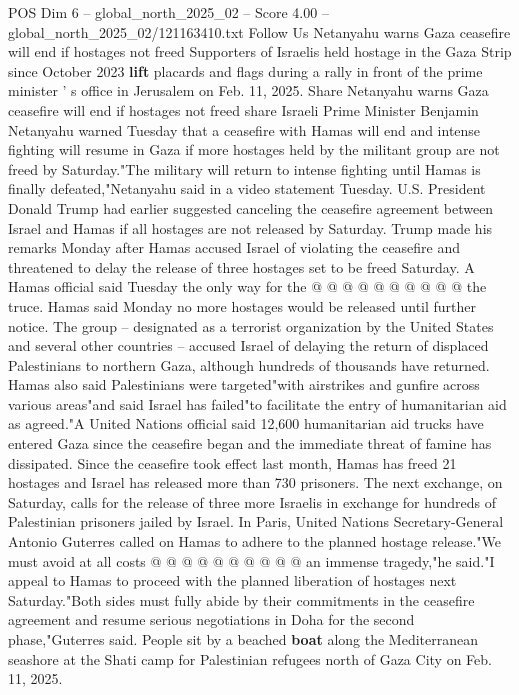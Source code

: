\begin{textsample}{POS Dim 6 – global\_north\_2025\_02 – Score 4.00 – global\_north\_2025\_02/121163410.txt}  \label{ex:f6_pos_346}
Follow Us Netanyahu warns Gaza ceasefire will end if hostages not freed Supporters of Israelis held hostage in the Gaza Strip since October 2023 \textbf{lift} placards and flags during a rally in front of the prime minister ' s office in Jerusalem on Feb. 11, 2025.
Share Netanyahu warns Gaza ceasefire will end if hostages not freed share Israeli Prime Minister Benjamin Netanyahu warned Tuesday that a ceasefire with Hamas will end and intense fighting will resume in Gaza if more hostages held by the militant group are not freed by Saturday."The military will return to intense fighting until Hamas is finally defeated,"Netanyahu said in a video statement Tuesday.
U.S.
President Donald Trump had earlier suggested canceling the ceasefire agreement between Israel and Hamas if all hostages are not released by Saturday.
Trump made his remarks Monday after Hamas accused Israel of violating the ceasefire and threatened to delay the release of three hostages set to be freed Saturday.
A Hamas official said Tuesday the only way for the @ @ @ @ @ @ @ @ @ @ the truce.
Hamas said Monday no more hostages would be released until further notice.
The group -- designated as a terrorist organization by the United States and several other countries -- accused Israel of delaying the return of displaced Palestinians to northern Gaza, although hundreds of thousands have returned.
Hamas also said Palestinians were targeted"with airstrikes and gunfire across various areas"and said Israel has failed"to facilitate the entry of humanitarian aid as agreed."A United Nations official said 12,600 humanitarian aid trucks have entered Gaza since the ceasefire began and the immediate threat of famine has dissipated.
Since the ceasefire took effect last month, Hamas has freed 21 hostages and Israel has released more than 730 prisoners.
The next exchange, on Saturday, calls for the release of three more Israelis in exchange for hundreds of Palestinian prisoners jailed by Israel.
In Paris, United Nations Secretary-General Antonio Guterres called on Hamas to adhere to the planned hostage release."We must avoid at all costs @ @ @ @ @ @ @ @ @ @ an immense tragedy,"he said."I appeal to Hamas to proceed with the planned liberation of hostages next Saturday."Both sides must fully abide by their commitments in the ceasefire agreement and resume serious negotiations in Doha for the second phase,"Guterres said.
People sit by a beached \textbf{boat} along the Mediterranean seashore at the Shati camp for Palestinian refugees north of Gaza City on Feb. 11, 2025.

\end{textsample}
